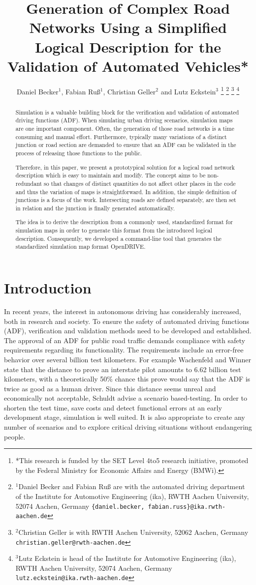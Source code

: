 \documentclass[a4paper, 10pt, conference]{ieeeconf}      %
\title{\LARGE \bf
Generation of Complex Road Networks Using a Simplified Logical Description for the Validation of Automated Vehicles*
}
\author{Daniel Becker$^{1}$, Fabian Ru{\ss}$^{1}$, Christian Geller$^2$ and Lutz Eckstein$^{3}$%
\thanks{*This research is funded by the SET Level 4to5 research initiative, promoted by the	Federal Ministry for Economic Affairs and Energy (BMWi).}%
\thanks{$^{1}$Daniel Becker and Fabian Ru{\ss} are with the automated driving department of the Institute for Automotive Engineering (ika), RWTH Aachen University, 52074 	Aachen, Germany {\tt\small \{daniel.becker, fabian.russ\}@ika.rwth-aachen.de}}%
\thanks{$^{2}$Christian Geller is with RWTH Aachen University, 52062 Aachen, Germany
	{\tt\small christian.geller@rwth-aachen.de}}%
\thanks{$^{3}$Lutz Eckstein is head of the Institute for Automotive Engineering (ika), RWTH Aachen University, 52074 Aachen, Germany {\tt\small lutz.eckstein@ika.rwth-aachen.de}}%
}
\begin{document}
\maketitle
\thispagestyle{empty}
\pagestyle{empty}

\begin{abstract} %
Simulation is a valuable building block for the verification and validation of automated driving functions (ADF). When simulating urban driving scenarios, simulation maps are one important component. Often, the generation of those road networks is a time consuming and manual effort. Furthermore, typically many variations of a distinct junction or road section are demanded to ensure that an ADF can be validated in the process of releasing those functions to the public. 

Therefore, in this paper, we present a prototypical solution for a logical road network description which is easy to maintain and modify. The concept aims to be non-redundant so that changes of distinct quantities do not affect other places in the code and thus the variation of maps is straightforward. In addition, the simple definition of junctions is a focus of the work. Intersecting roads are defined separately, are then set in relation and the junction is finally generated automatically. 

The idea is to derive the description from a commonly used, standardized format for simulation maps in order to generate this format from the introduced logical description. Consequently, we developed a command-line tool that generates the standardized simulation map format OpenDRIVE.

\end{abstract}

\section{Introduction}
In recent years, the interest in autonomous driving has considerably increased, both in research and society. To ensure the safety of automated driving functions (ADF), verification and validation methods need to be developed and established. The approval of an ADF for public road traffic demands compliance with safety requirements regarding its functionality. The requirements include an error-free behavior over several billion test kilometers. For example Wachenfeld and Winner \cite{wachenfeld2016release} state that the distance to prove an interstate pilot amounts to 6.62 billion test kilometers, with a theoretically 50\% chance this prove would say that the ADF is twice as good as a human driver. Since this distance seems unreal and economically not acceptable, Schuldt \cite{schuldt2017beitrag} advise a scenario based-testing. In order to shorten the test time, save costs and detect functional errors at an early development stage, simulation is well suited. It is also appropriate to create any number of scenarios and to explore critical driving situations without endangering people.
\end{document}
